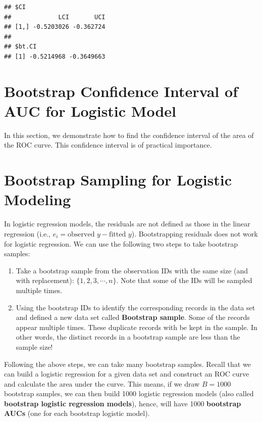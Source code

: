 \documentclass[
]{book}
\begin{document}
\begin{verbatim}
## $CI
##             LCI       UCI
## [1,] -0.5203026 -0.362724
## 
## $bt.CI
## [1] -0.5214968 -0.3649663
\end{verbatim}

\hfill\break

\hypertarget{bootstrap-confidence-interval-of-auc-for-logistic-model}{%
\section{Bootstrap Confidence Interval of AUC for Logistic Model}\label{bootstrap-confidence-interval-of-auc-for-logistic-model}}

In this section, we demonstrate how to find the confidence interval of the area of the ROC curve. This confidence interval is of practical importance.

\hypertarget{bootstrap-sampling-for-logistic-modeling}{%
\section{Bootstrap Sampling for Logistic Modeling}\label{bootstrap-sampling-for-logistic-modeling}}

In logistic regression models, the residuals are not defined as those in the linear regression (i.e., \(e_i = \text{observed }y - \text{fitted }y\)). Bootstrapping residuals does not work for logistic regression. We can use the following two steps to take bootstrap samples:

\begin{enumerate}
\def\labelenumi{\arabic{enumi}.}
\item
  Take a bootstrap sample from the observation IDs with the same size (and with replacement): \(\{1, 2, 3, \cdots, n \}\). Note that some of the IDs will be sampled multiple times.
\item
  Using the bootstrap IDs to identify the corresponding records in the data set and defined a new data set called \textbf{Bootstrap sample}. Some of the records appear multiple times. These duplicate records with be kept in the sample. In other words, the distinct records in a bootstrap sample are less than the sample size!
\end{enumerate}

Following the above steps, we can take many bootstrap samples. Recall that we can build a logistic regression for a given data set and construct an ROC curve and calculate the area under the curve. This means, if we draw \(B = 1000\) bootstrap samples, we can then build 1000 logistic regression models (also called \textbf{bootstrap logistic regression models}), hence, will have 1000 \textbf{bootstrap AUCs} (one for each bootstrap logistic model).
\end{document}
